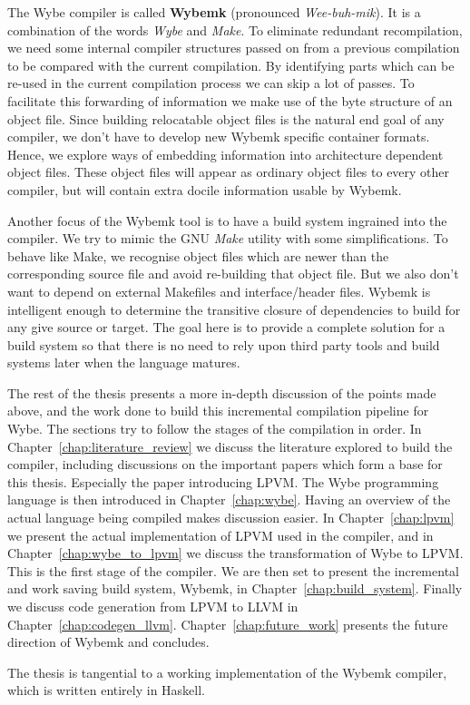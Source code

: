 The Wybe compiler is called \textbf{Wybemk} (pronounced
\textit{Wee-buh-mik}). It is a combination of the words \textit{Wybe} and
\textit{Make}. To eliminate redundant recompilation, we need some internal
compiler structures passed on from a previous compilation to be compared with
the current compilation. By identifying parts which can be re-used in the
current compilation process we can skip a lot of passes. To facilitate this
forwarding of information we make use of the byte structure of an object
file. Since building relocatable object files is the natural end goal of any
compiler, we don't have to develop new Wybemk specific container
formats. Hence, we explore ways of embedding information into architecture
dependent object files. These object files will appear as ordinary object files
to every other compiler, but will contain extra docile information usable by
Wybemk.

Another focus of the Wybemk tool is to have a build system ingrained into the
compiler. We try to mimic the GNU \textit{Make} utility \citep{make} with some
simplifications. To behave like Make, we recognise object files which are newer
than the corresponding source file and avoid re-building that object file. But
we also don't want to depend on external Makefiles and interface/header
files. Wybemk is intelligent enough to determine the transitive closure of
dependencies to build for any give source or target. The goal here is to
provide a complete solution for a build system so that there is no need to rely
upon third party tools and build systems later when the language matures.


The rest of the thesis presents a more in-depth discussion of the points made
above, and the work done to build this incremental compilation pipeline for
Wybe. The sections try to follow the stages of the compilation in order. In
Chapter~\ref{chap:literature_review} we discuss the literature explored to
build the compiler, including discussions on the important papers which form a
base for this thesis. Especially the paper introducing LPVM. The Wybe
programming language is then introduced in Chapter~\ref{chap:wybe}. Having an
overview of the actual language being compiled makes discussion easier. In
Chapter~\ref{chap:lpvm} we present the actual implementation of LPVM used in
the compiler, and in Chapter~\ref{chap:wybe_to_lpvm} we discuss the
transformation of Wybe to LPVM. This is the first stage of the compiler. We are
then set to present the incremental and work saving build system, Wybemk, in
Chapter~\ref{chap:build_system}. Finally we discuss code generation from LPVM
to LLVM in Chapter~\ref{chap:codegen_llvm}. Chapter~\ref{chap:future_work}
presents the future direction of Wybemk and concludes.

The thesis is tangential to a
working implementation of the Wybemk compiler, which is written entirely in
Haskell.


